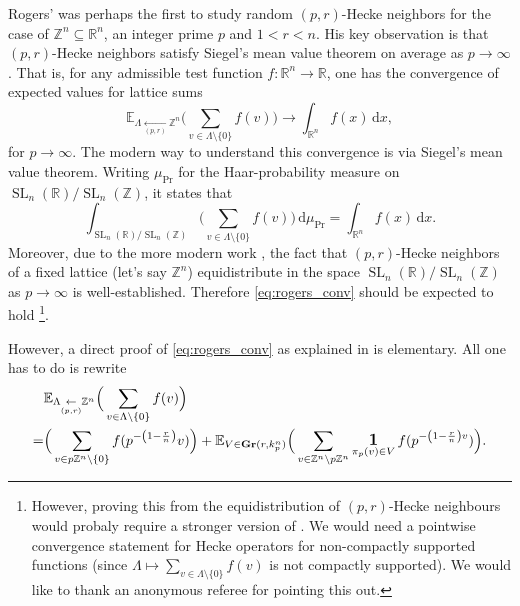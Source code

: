 \documentclass{amsart}
\theoremstyle{definition}
\theoremstyle{remark}
\newcommand{\diff}{\,\mathrm{d}}
\newcommand{\hecke}[2]{ \underset{( #1, #2 )}{\leftarrow} }
\DeclareMathOperator{\SL}{SL}
\DeclareMathOperator{\ind}{\mathlarger{\mathbf{1}}}
\DeclareMathOperator{\Gr}{\mathbf{Gr}}
\begin{document}
Rogers' \cite{Rog47} was perhaps the first to study random $(p,r)$-Hecke neighbors 
for the case of $\mathbb{Z}^{n} \subseteq \mathbb{R}^{n}$, an integer prime $p$ and $1 < r < n$. 
His key observation is that $(p,r)$-Hecke neighbors satisfy Siegel's mean value theorem on average as $p \rightarrow \infty$. That is, for any admissible test function $f:\mathbb{R}^{n} \rightarrow  \mathbb{R}$, one has the convergence of expected values for lattice sums
\begin{equation}
    \mathbb{E}_{\Lambda \hecke{p}{r} \mathbb{Z}^{n} }\Big( \sum_{v \in \Lambda \setminus \{0\}} f(v) \Big) 
    \rightarrow \int_{\mathbb{R}^{n}} f(x) \diff x,
    \label{eq:rogers_conv}
\end{equation}
for $p \rightarrow  \infty$. 
The modern way to understand this convergence is via Siegel's mean value theorem. Writing $\mu_{\Pr}$ for the Haar-probability measure on $\SL_{n}(\mathbb{R})/\SL_{n}(\mathbb{Z})$, it states that
\begin{equation}
    \int_{\SL_{n}(\mathbb{R})/\SL_{n}(\mathbb{Z})} \Big( \sum_{v \in \Lambda \setminus \{0\}} f(v) \Big) 
    \diff \mu_{\Pr}
    = \int_{\mathbb{R}^{n}} f(x) \diff x.
\end{equation}
Moreover, due to the more modern work \cite{EOL01}, the fact that $(p,r)$-Hecke neighbors of a fixed lattice (let's say $\mathbb{Z}^{n}$) equidistribute in the space $\SL_{n}(\mathbb{R})/\SL_{n}(\mathbb{Z})$ as $p\to \infty$ is well-established. Therefore \cref{eq:rogers_conv} should be expected to hold \footnote{However, proving this from the equidistribution of $(p,r)$-Hecke neighbours would probaly require a stronger version of \cite[Theorem 1.6]{EOL01}. We would need a pointwise convergence statement for Hecke operators for non-compactly supported functions (since $\Lambda \mapsto \sum_{v \in\Lambda \setminus \{0\}} f(v)$ is not compactly supported). We would like to thank an anonymous referee for pointing this out.}.

However, a direct proof of \cref{eq:rogers_conv} as explained in \cite{Rog47} is elementary. All one has to do is rewrite 
\begin{align}
& \mathbb{E}_{\Lambda \hecke{p}{r} \mathbb{Z}^{n} }\Big( \sum_{v \in \Lambda \setminus \{0\}} f(v) \Big)  \\
= 
& \Big(\sum_{v \in p \mathbb{Z}^{n} \setminus \{0\}} f(p^{-\left(1-\frac{r}{n}\right)} v)\Big) + 
\mathbb{E}_{V \in \Gr(r,k_{p}^{n})} 
\Big(\sum_{v \in \mathbb{Z}^{n}  \setminus p \mathbb{Z}^{n}} \ind_{\pi_{p}(v) \in V} f ( p^{- \left( 1-\frac{r}{n}  \right) v })\Big).
\end{align}
\end{document}
